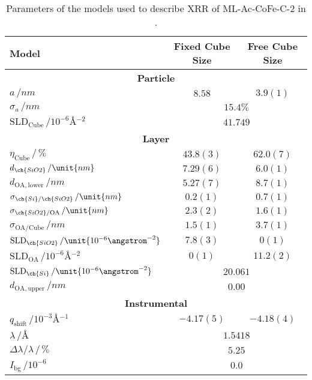 \documentclass[\main/dresen_thesis.tex]{subfiles}
\begin{document}
  \begin{table}[ht]
    \centering
    \caption{\label{tab:monolayers:structure:squareArrayParacrystal:XRR}Parameters of the models used to describe XRR of ML-Ac-CoFe-C-2 in .}
    \begin{tabular}{l | c | c}
      \hline
      Model&
      \textbf{Fixed Cube Size} &
      \textbf{Free Cube Size}\\
      \hline
      \multicolumn{3}{c}{\textbf{Particle}}\\
      \hline
      $a \, / \unit{nm}$ &
      $8.58$ &
      $3.9(1)$\\
      $\sigma_a \, / \unit{nm}$ &
        \multicolumn{2}{c}{$15.4 \unit{\%}$} \\
      $\mathrm{SLD}_\mathrm{Cube} \, / \unit{10^{-6} \angstrom^{-2}}$ &
        \multicolumn{2}{c}{$41.749$} \\
      \hline
      \multicolumn{3}{c}{\textbf{Layer}}\\
      \hline
      $\eta_\mathrm{Cube} \, /\, \%$ &
        $43.8(3) $ &
        $62.0(7) $ \\
      $d_{\ch{SiO2}} \, / \unit{nm}$ &
        $7.29(6)$ &
        $6.0(1)$ \\
      $d_{\mathrm{OA, lower}}\, / \unit{nm}$ &
        $5.27(7)$ &
        $8.7(1)$ \\
      $\sigma_{\ch{Si}/\ch{SiO2}} \, / \unit{nm}$ &
        $0.2(1)$ &
        $0.7(1)$ \\
      $\sigma_{\ch{SiO2}/\mathrm{OA}}\, / \unit{nm}$ &
        $2.3(2)$ &
        $1.6(1)$ \\
      $\sigma_\mathrm{OA/Cube} \, / \unit{nm}$ &
        $1.5(1)$ &
        $3.7(1)$ \\
      $\mathrm{SLD}_{\ch{SiO2}} \, / \unit{10^{-6} \angstrom^{-2}}$ &
        $7.8(3)$ &
        $0(1)$\\
      $\mathrm{SLD}_\mathrm{OA} \, / \unit{10^{-6} \angstrom^{-2}}$ &
        $0(1)$ &
        $11.2(2)$ \\
      \hline
      $\mathrm{SLD}_{\ch{Si}} \, / \unit{10^{-6} \angstrom^{-2}}$ &
        \multicolumn{2}{c}{$20.061$} \\
      $d_{\mathrm{OA, upper}}\, / \unit{nm}$ &
        \multicolumn{2}{c}{$0.00$} \\
      \hline
      \multicolumn{3}{c}{\textbf{Instrumental}}\\
      \hline
      $q_\mathrm{shift} \,/ \unit{10^{-3} \angstrom^{-1}}$ &
        $-4.17(5)$ &
        $-4.18(4)$\\
      $\lambda \, / \unit{\angstrom}$ &
        \multicolumn{2}{c}{$1.5418$}\\
      $\Delta \lambda / \lambda\, /\, \%$ &
        \multicolumn{2}{c}{$5.25$} \\
      $I_\mathrm{bg} \, / \unit{10^{-6}}$ &
        \multicolumn{2}{c}{$0.0$} \\
      \hline
    \end{tabular}
  \end{table}
\end{document}
